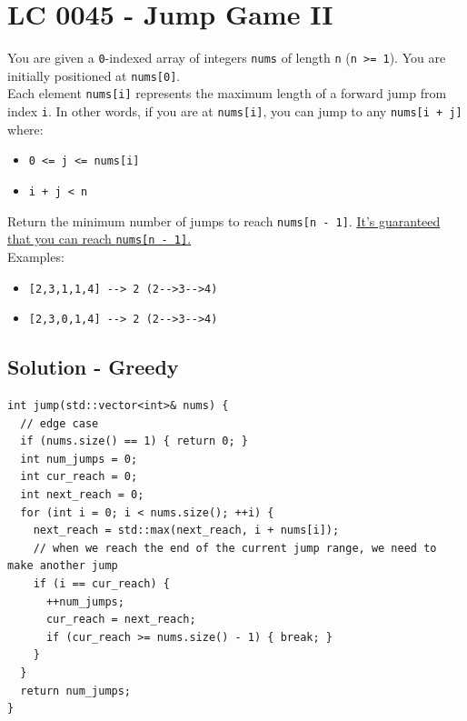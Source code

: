 \section{LC 0045 - Jump Game II}\label{lc0045}
You are given a {\colorbox{CodeBackground}{\lstinline|0|}}-indexed array of integers {\colorbox{CodeBackground}{\lstinline|nums|}} of length {\colorbox{CodeBackground}{\lstinline|n|}} ({\colorbox{CodeBackground}{\lstinline|n >= 1|}}). You are initially positioned at {\colorbox{CodeBackground}{\lstinline|nums[0]|}}. \\

Each element {\colorbox{CodeBackground}{\lstinline|nums[i]|}} represents the maximum length of a forward jump from index {\colorbox{CodeBackground}{\lstinline|i|}}. In other words, if you are at {\colorbox{CodeBackground}{\lstinline|nums[i]|}}, you can jump to any {\colorbox{CodeBackground}{\lstinline|nums[i + j]|}} where:
\begin{itemize}
	\item {\colorbox{CodeBackground}{\lstinline|0 <= j <= nums[i]|}}
	\item {\colorbox{CodeBackground}{\lstinline|i + j < n|}}
\end{itemize}

Return the minimum number of jumps to reach {\colorbox{CodeBackground}{\lstinline|nums[n - 1]|}}. \ul{It's guaranteed that you can reach {\colorbox{CodeBackground}{\lstinline|nums[n - 1]|}}.}\\

Examples:
\begin{itemize}
	\item {\colorbox{CodeBackground}{\lstinline|[2,3,1,1,4] --> 2 (2-->3-->4)|}}
	\item {\colorbox{CodeBackground}{\lstinline|[2,3,0,1,4] --> 2 (2-->3-->4)|}}
\end{itemize}

\subsection*{Solution - Greedy}\label{solution:lc0045_greedy}
\begin{lstlisting}
int jump(std::vector<int>& nums) {
  // edge case
  if (nums.size() == 1) { return 0; }
  int num_jumps = 0;
  int cur_reach = 0;
  int next_reach = 0;
  for (int i = 0; i < nums.size(); ++i) {
    next_reach = std::max(next_reach, i + nums[i]);
    // when we reach the end of the current jump range, we need to make another jump
    if (i == cur_reach) {
      ++num_jumps;
      cur_reach = next_reach;
      if (cur_reach >= nums.size() - 1) { break; }
    }
  }
  return num_jumps;
}
\end{lstlisting}

